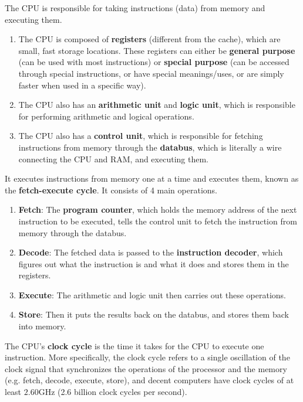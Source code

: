 \documentclass{article}
\begin{document}
    \begin{definition}
      The CPU is responsible for taking instructions (data) from memory and executing them. 
      \begin{enumerate} 
        \item The CPU is composed of \textbf{registers} (different from the cache), which are small, fast storage locations. These registers can either be \textbf{general purpose} (can be used with most instructions) or \textbf{special purpose} (can be accessed through special instructions, or have special meanings/uses, or are simply faster when used in a specific way).
        \item The CPU also has an \textbf{arithmetic unit} and \textbf{logic unit}, which is responsible for performing arithmetic and logical operations. 
        \item The CPU also has a \textbf{control unit}, which is responsible for fetching instructions from memory through the \textbf{databus}, which is literally a wire connecting the CPU and RAM, and executing them. 
      \end{enumerate}
      It executes instructions from memory one at a time and executes them, known as the \textbf{fetch-execute cycle}. It consists of 4 main operations. 
      \begin{enumerate} 
        \item \textbf{Fetch}: The \textbf{program counter}, which holds the memory address of the next instruction to be executed, tells the control unit to fetch the instruction from memory through the databus. 
        \item \textbf{Decode}: The fetched data is passed to the \textbf{instruction decoder}, which figures out what the instruction is and what it does and stores them in the registers.
        \item \textbf{Execute}: The arithmetic and logic unit then carries out these operations. 
        \item \textbf{Store}: Then it puts the results back on the databus, and stores them back into memory.
      \end{enumerate} 
      The CPU's \textbf{clock cycle} is the time it takes for the CPU to execute one instruction. More specifically, the clock cycle refers to a single oscillation of the clock signal that synchronizes the operations of the processor and the memory (e.g. fetch, decode, execute, store), and decent computers have clock cycles of at least $2.60$GHz (2.6 billion clock cycles per second). 
    \end{definition}
\end{document}
